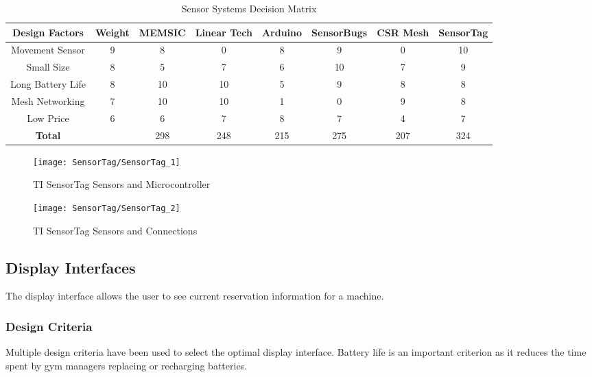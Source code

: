 \documentclass[PPFS.tex]{template/subfiles}
\begin{document}
\begin{table}[H]
   	\begin{center}
   		\caption{Sensor Systems Decision Matrix}
   		\label{tab:sensorsMatrix}
   		\begin{tabular}{|c|c|c|c|c|c|c|c|}
   			\hline
   			Design Factors & Weight & MEMSIC & Linear Tech & Arduino & SensorBugs & CSR Mesh & SensorTag \\
   			\hline
   			Movement Sensor & 9 & 8 & 0 & 8 & 9 & 0 & 10 \\
   			\hline
   			Small Size & 8 & 5 & 7 & 6 & 10 & 7 & 9 \\
   			\hline
   			Long Battery Life & 8 & 10 & 10 & 5 & 9 & 8 & 8 \\
   			\hline
   			Mesh Networking & 7 & 10 & 10 & 1 & 0 & 9 & 8 \\
   			\hline
   			Low Price & 6 & 6 & 7 & 8 & 7 & 4 & 7 \\
   			\hline
   			\textbf{Total} & & 298 & 248 & 215 & 275 & 207 & 324 \\
   			\hline
   		\end{tabular}
   	\end{center}
\end{table}

\begin{figure}[H]
	\centering
	\texttt{[image: SensorTag/SensorTag\_1]}
	\caption{TI SensorTag Sensors and Microcontroller \cite{SensorTag2}}
	\label{fig:TISensorTag1}
\end{figure}

\begin{figure}[H]
	\centering
	\texttt{[image: SensorTag/SensorTag\_2]}
	\caption{TI SensorTag Sensors and Connections \cite{SensorTag2}}
	\label{fig:TISensorTag2}
\end{figure}

\subsection{Display Interfaces}

The display interface allows the user to see current reservation information for a machine.

\subsubsection{Design Criteria}

Multiple design criteria have been used to select the optimal display interface. Battery life is an important criterion as it reduces the time spent by gym managers replacing or recharging batteries.
\end{document}
